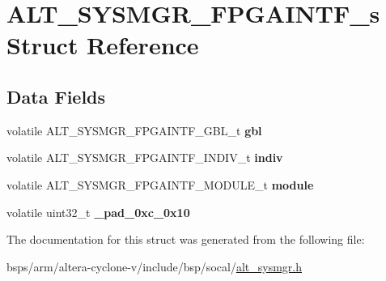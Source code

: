 \hypertarget{structALT__SYSMGR__FPGAINTF__s}{}\section{A\+L\+T\+\_\+\+S\+Y\+S\+M\+G\+R\+\_\+\+F\+P\+G\+A\+I\+N\+T\+F\+\_\+s Struct Reference}
\label{structALT__SYSMGR__FPGAINTF__s}
\subsection*{Data Fields}
\begin{DoxyCompactItemize}
\item 
\mbox{\label{structALT__SYSMGR__FPGAINTF__s_af2544fe3e8c66bd16bd35253e9d40d4c}} 
volatile A\+L\+T\+\_\+\+S\+Y\+S\+M\+G\+R\+\_\+\+F\+P\+G\+A\+I\+N\+T\+F\+\_\+\+G\+B\+L\+\_\+t {\bfseries gbl}
\item 
\mbox{\label{structALT__SYSMGR__FPGAINTF__s_a8affbf81d1b19fbfc20d53d545f4529f}} 
volatile A\+L\+T\+\_\+\+S\+Y\+S\+M\+G\+R\+\_\+\+F\+P\+G\+A\+I\+N\+T\+F\+\_\+\+I\+N\+D\+I\+V\+\_\+t {\bfseries indiv}
\item 
\mbox{\label{structALT__SYSMGR__FPGAINTF__s_a5c28eb9d3abf162cde03b68dc1310ceb}} 
volatile A\+L\+T\+\_\+\+S\+Y\+S\+M\+G\+R\+\_\+\+F\+P\+G\+A\+I\+N\+T\+F\+\_\+\+M\+O\+D\+U\+L\+E\+\_\+t {\bfseries module}
\item 
\mbox{\label{structALT__SYSMGR__FPGAINTF__s_a8e39f6c7559af5191a26d87f4a972aac}} 
volatile uint32\+\_\+t {\bfseries \+\_\+pad\+\_\+0xc\+\_\+0x10}
\end{DoxyCompactItemize}


The documentation for this struct was generated from the following file\+:\begin{DoxyCompactItemize}
\item 
bsps/arm/altera-\/cyclone-\/v/include/bsp/socal/\mbox{\hyperlink{alt__sysmgr_8h}{alt\+\_\+sysmgr.\+h}}\end{DoxyCompactItemize}
